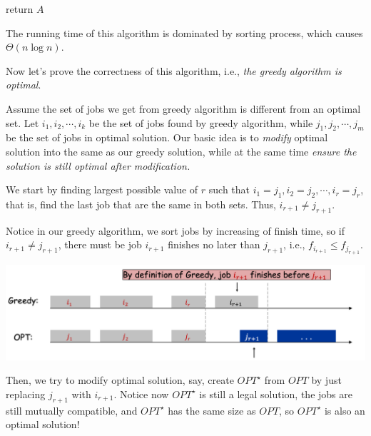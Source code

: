 \begin{spacing}{1.3}
\begin{algorithm*}
        return $A$
    \end{algorithm*}

    The running time of this algorithm is dominated by sorting process, which causes $\Theta(n\log n)$.

    Now let's prove the correctness of this algorithm, i.e., {\it the greedy algorithm is optimal}.

    Assume the set of jobs we get from greedy algorithm is different from an optimal set.
    Let $i_1,i_2,\cdots, i_k$ be the set of jobs found by greedy algorithm, while 
    $j_1,j_2,\cdots,j_m$ be the set of jobs in optimal solution. Our basic idea is to 
    {\it modify} optimal solution into the same as our greedy solution, while at the same time 
    {\it ensure the solution is still optimal after modification.}

    We start by finding largest possible value of $r$ such that $i_1=j_1, i_2=j_2, \cdots, i_r=j_r$,
    that is, find the last job that are the same in both sets. Thus, $i_{r+1}\ne j_{r+1}$.

    Notice in our greedy algorithm, we sort jobs by increasing of finish time, so if $i_{r+1}\ne j_{r+1}$,
    there must be job $i_{r+1}$ finishes no later than $j_{r+1}$, i.e., $f_{i_{r+1}}\le f_{j_{r+1}}$.
    \begin{center}
        \includegraphics[scale=0.35]{images/07-interval-proof.png}
    \end{center}
    Then, we try to modify optimal solution, say, create $OPT^\star$ from $OPT$ by just replacing 
    $j_{r+1}$ with $i_{r+1}$. Notice now $OPT^\star$ is still a legal solution, the jobs are
    still mutually compatible, and $OPT^\star$ has the same size as $OPT$, so $OPT^\star$ is 
    also an optimal solution!


\end{spacing}

